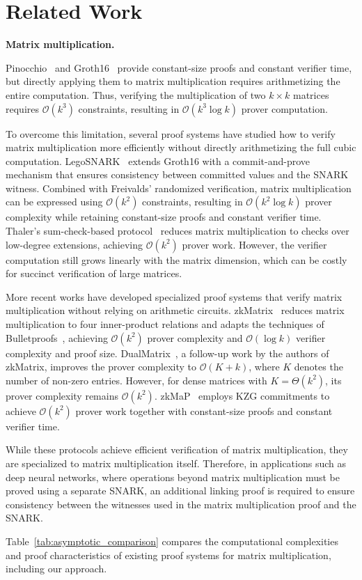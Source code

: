 \section{Related Work}
\label{sec:related}

\noindent\textbf{Matrix multiplication.}
\begin{revblock}
Pinocchio~\cite{pinocchio} and Groth16~\cite{groth2016size} provide constant-size proofs and constant verifier time, but directly applying them to matrix multiplication requires arithmetizing the entire computation. 
Thus, verifying the multiplication of two $k \times k$ matrices requires $\mathcal{O}(k^3)$ constraints, resulting in $\mathcal{O}(k^3 \log k)$ prover computation.

To overcome this limitation, several proof systems have studied how to verify matrix multiplication more efficiently without directly arithmetizing the full cubic computation.
LegoSNARK~\cite{legosnark} extends Groth16 with a commit-and-prove mechanism that ensures consistency between committed values and the SNARK witness.
Combined with Freivalds' randomized verification, matrix multiplication can be expressed using $\mathcal{O}(k^2)$ constraints, resulting in $\mathcal{O}(k^2 \log k)$ prover complexity while retaining constant-size proofs and constant verifier time.
Thaler's sum-check-based protocol~\cite{thaler2013time} reduces matrix multiplication to checks over low-degree extensions, achieving $\mathcal{O}(k^2)$ prover work. 
However, the verifier computation still grows linearly with the matrix dimension, which can be costly for succinct verification of large matrices.

More recent works have developed specialized proof systems that verify matrix multiplication without relying on arithmetic circuits.
zkMatrix~\cite{cong2024zkmatrix} reduces matrix multiplication to four inner-product relations and adapts the techniques of Bulletproofs~\cite{bunz2018bulletproofs}, achieving $\mathcal{O}(k^2)$ prover complexity and $\mathcal{O}(\log k)$ verifier complexity and proof size.
DualMatrix~\cite{cong2026dualmatrix}, a follow-up work by the authors of zkMatrix, improves the prover complexity to $\mathcal{O}(K+k)$, where $K$ denotes the number of non-zero entries.
However, for dense matrices with $K=\Theta(k^2)$, its prover complexity remains $\mathcal{O}(k^2)$. zkMaP~\cite{zkMaP} employs KZG commitments to achieve $\mathcal{O}(k^2)$ prover work together with constant-size proofs and constant verifier time.

While these protocols achieve efficient verification of matrix multiplication, they are specialized to matrix multiplication itself. Therefore, in applications such as deep neural networks, where operations beyond matrix multiplication must be proved using a separate SNARK, an additional linking proof is required to ensure consistency between the witnesses used in the matrix multiplication proof and the SNARK.

Table~\ref{tab:asymptotic_comparison} compares the computational complexities and proof characteristics of existing proof systems for matrix multiplication, including our approach.
\end{revblock}
